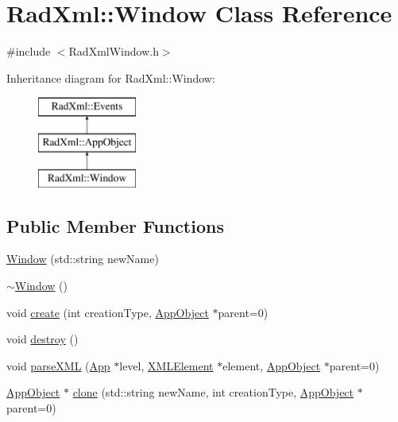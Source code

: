 \hypertarget{class_rad_xml_1_1_window}{\section{Rad\-Xml\-:\-:Window Class Reference}
\label{class_rad_xml_1_1_window}
}


{\ttfamily \#include $<$Rad\-Xml\-Window.\-h$>$}

Inheritance diagram for Rad\-Xml\-:\-:Window\-:\begin{figure}[H]
\begin{center}
\leavevmode
\includegraphics[height=3.000000cm]{class_rad_xml_1_1_window}
\end{center}
\end{figure}
\subsection*{Public Member Functions}
\begin{DoxyCompactItemize}
\item 
\hyperlink{class_rad_xml_1_1_window_adb43befd27a06d2eabd0143ab6031030}{Window} (std\-::string new\-Name)
\item 
\hyperlink{class_rad_xml_1_1_window_aab697052f11c863da4a211ca4d47f19c}{$\sim$\-Window} ()
\item 
void \hyperlink{class_rad_xml_1_1_window_a3ddd0bf91095f6c692a76804d905a7cf}{create} (int creation\-Type, \hyperlink{class_rad_xml_1_1_app_object}{App\-Object} $\ast$parent=0)
\item 
void \hyperlink{class_rad_xml_1_1_window_a2f55306eb82a2d35dc5f136410362a0d}{destroy} ()
\item 
void \hyperlink{class_rad_xml_1_1_window_a5386256649ae5e846b02f65db1c6cd41}{parse\-X\-M\-L} (\hyperlink{class_rad_xml_1_1_app}{App} $\ast$level, \hyperlink{class_x_m_l_element}{X\-M\-L\-Element} $\ast$element, \hyperlink{class_rad_xml_1_1_app_object}{App\-Object} $\ast$parent=0)
\item 
\hyperlink{class_rad_xml_1_1_app_object}{App\-Object} $\ast$ \hyperlink{class_rad_xml_1_1_window_ac75e04b149706f14ab6cc9445cf3734b}{clone} (std\-::string new\-Name, int creation\-Type, \hyperlink{class_rad_xml_1_1_app_object}{App\-Object} $\ast$parent=0)
\end{DoxyCompactItemize}
